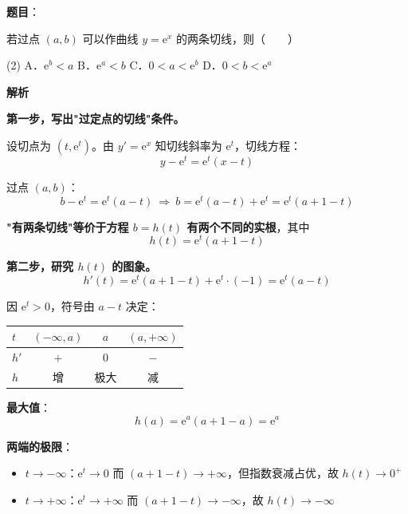 \begin{answer}

\textbf{题目}：

若过点 $(a,b)$ 可以作曲线 $y=\mathrm e^{x}$ 的两条切线，则\mbox{（　　）}

\begin{gkopts}(2)
\task A．$\mathrm e^{b}<a$
\task B．$\mathrm e^{a}<b$
\task C．$0<a<\mathrm e^{b}$
\task D．$0<b<\mathrm e^{a}$
\end{gkopts}

\textbf{解析}

\textbf{第一步，写出"过定点的切线"条件。}

设切点为 $\left(t,\mathrm e^{t}\right)$。由 $y'=\mathrm e^{x}$ 知切线斜率为 $\mathrm e^{t}$，切线方程：
\nopagebreak[4]
\[y-\mathrm e^{t}=\mathrm e^{t}(x-t)\]

过点 $(a,b)$：
\nopagebreak[4]
\[b-\mathrm e^{t}=\mathrm e^{t}(a-t)\ \Longrightarrow\ b=\mathrm e^{t}(a-t)+\mathrm e^{t}=\mathrm e^{t}(a+1-t)\]

\textbf{"有两条切线"等价于方程 $b=h(t)$ 有两个不同的实根}，其中
\nopagebreak[4]
\[h(t)=\mathrm e^{t}(a+1-t)\]

\textbf{第二步，研究 $h(t)$ 的图象。}
\nopagebreak[4]
\[h'(t)=\mathrm e^{t}(a+1-t)+\mathrm e^{t}\cdot(-1)=\mathrm e^{t}(a-t)\]

因 $\mathrm e^{t}>0$，符号由 $a-t$ 决定：

\begin{center}
\begin{tabular}{lccc}
\toprule
$t$ & $(-\infty,a)$ & $a$ & $(a,+\infty)$ \\
\midrule
$h'$ & $+$ & $0$ & $-$ \\
$h$ & 增 & 极大 & 减 \\
\bottomrule
\end{tabular}
\end{center}

\textbf{最大值}：
\nopagebreak[4]
\[h(a)=\mathrm e^{a}(a+1-a)=\mathrm e^{a}\]

\textbf{两端的极限}：
\begin{itemize}
\item $t\to-\infty$：$\mathrm e^{t}\to0$ 而 $(a+1-t)\to+\infty$，但指数衰减占优，故 $h(t)\to0^{+}$
\item $t\to+\infty$：$\mathrm e^{t}\to+\infty$ 而 $(a+1-t)\to-\infty$，故 $h(t)\to-\infty$
\end{itemize}


\end{answer}
